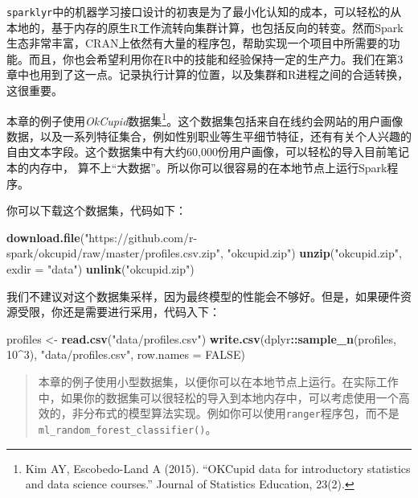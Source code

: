 \documentclass[
]{article}
\newenvironment{Shaded}{\begin{snugshade}}{\end{snugshade}}
\newcommand{\DataTypeTok}[1]{\textcolor[rgb]{0.13,0.29,0.53}{#1}}
\newcommand{\DecValTok}[1]{\textcolor[rgb]{0.00,0.00,0.81}{#1}}
\newcommand{\KeywordTok}[1]{\textcolor[rgb]{0.13,0.29,0.53}{\textbf{#1}}}
\newcommand{\NormalTok}[1]{#1}
\newcommand{\OperatorTok}[1]{\textcolor[rgb]{0.81,0.36,0.00}{\textbf{#1}}}
\newcommand{\OtherTok}[1]{\textcolor[rgb]{0.56,0.35,0.01}{#1}}
\newcommand{\StringTok}[1]{\textcolor[rgb]{0.31,0.60,0.02}{#1}}
\begin{document}
\texttt{sparklyr}中的机器学习接口设计的初衷是为了最小化认知的成本，可以轻松的从本地的，基于内存的原生R工作流转向集群计算，也包括反向的转变。然而Spark生态非常丰富，CRAN上依然有大量的程序包，帮助实现一个项目中所需要的功能。而且，你也会希望利用你在R中的技能和经验保持一定的生产力。我们在第3章中也用到了这一点。记录执行计算的位置，以及集群和R进程之间的合适转换，这很重要。

本章的例子使用\emph{OkCupid}数据集\footnote{Kim AY, Escobedo-Land A
  (2015). ``OKCupid data for introductory statistics and data science
  courses.'' Journal of Statistics Education, 23(2).}。这个数据集包括来自在线约会网站的用户画像数据，以及一系列特征集合，例如性别职业等生平细节特征，还有有关个人兴趣的自由文本字段。这个数据集中有大约60,000份用户画像，可以轻松的导入目前笔记本的内存中，
算不上``大数据''。所以你可以很容易的在本地节点上运行Spark程序。

你可以下载这个数据集，代码如下：

\begin{Shaded}
\begin{Highlighting}[]
\KeywordTok{download.file}\NormalTok{(}\StringTok{"https://github.com/r-spark/okcupid/raw/master/profiles.csv.zip"}\NormalTok{, }\StringTok{"okcupid.zip"}\NormalTok{)}
\KeywordTok{unzip}\NormalTok{(}\StringTok{"okcupid.zip"}\NormalTok{, }\DataTypeTok{exdir =} \StringTok{"data"}\NormalTok{)}
\KeywordTok{unlink}\NormalTok{(}\StringTok{"okcupid.zip"}\NormalTok{)}
\end{Highlighting}
\end{Shaded}

我们不建议对这个数据集采样，因为最终模型的性能会不够好。但是，如果硬件资源受限，你还是需要进行采用，代码入下：

\begin{Shaded}
\begin{Highlighting}[]
\NormalTok{profiles <-}\StringTok{ }\KeywordTok{read.csv}\NormalTok{(}\StringTok{"data/profiles.csv"}\NormalTok{)}
\KeywordTok{write.csv}\NormalTok{(dplyr}\OperatorTok{::}\KeywordTok{sample_n}\NormalTok{(profiles, }\DecValTok{10}\OperatorTok{^}\DecValTok{3}\NormalTok{), }\StringTok{"data/profiles.csv"}\NormalTok{, }\DataTypeTok{row.names =} \OtherTok{FALSE}\NormalTok{)}
\end{Highlighting}
\end{Shaded}

\begin{quote}
本章的例子使用小型数据集，以便你可以在本地节点上运行。在实际工作中，如果你的数据集可以很轻松的导入到本地内存中，可以考虑使用一个高效的，非分布式的模型算法实现。例如你可以使用\texttt{ranger}程序包，而不是\texttt{ml\_random\_forest\_classifier()}。
\end{quote}
\end{document}
